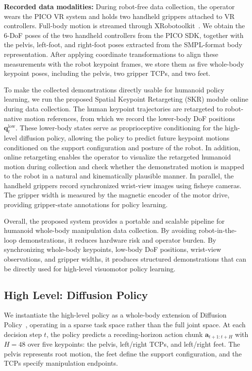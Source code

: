 \documentclass[letterpaper, 10 pt, conference]{ieeeconf}  %
\begin{document}
\textbf{Recorded data modalities:}
During robot-free data collection, the operator wears the PICO VR system and holds two handheld grippers attached to VR controllers. Full-body motion is streamed through XRobotoolkit~\cite{xrobotoolkit}. We obtain the 6-DoF poses of the two handheld controllers from the PICO SDK, together with the pelvis, left-foot, and right-foot poses extracted from the SMPL-format body representation. After applying coordinate transformations to align these measurements with the robot keypoint frames, we store them as five whole-body keypoint poses, including the pelvis, two gripper TCPs, and two feet.

To make the collected demonstrations directly usable for humanoid policy learning, we run the proposed Spatial Keypoint Retargeting (SKR) module online during data collection. The human keypoint trajectories are retargeted to robot-native motion references, from which we record the lower-body DoF positions $\mathbf{q}^{\mathrm{low}}_t$. These lower-body states serve as proprioceptive conditioning for the high-level diffusion policy, allowing the policy to predict future keypoint motions conditioned on the support configuration and posture of the robot. In addition, online retargeting enables the operator to visualize the retargeted humanoid motion during collection and check whether the demonstrated motion is mapped to the robot in a natural and kinematically plausible manner. In parallel, the handheld grippers record synchronized wrist-view images using fisheye cameras. The gripper width is measured by the magnetic encoder of the motor drive, providing gripper-state annotations for policy learning.




Overall, the proposed system provides a portable and scalable pipeline for humanoid whole-body manipulation data collection. By avoiding robot-in-the-loop demonstrations, it reduces hardware risk and operator burden. By synchronizing whole-body keypoints, low-body DoF positions, wrist-view observations, and gripper widths, it produces structured demonstrations that can be directly used for high-level visuomotor policy learning.




\subsection{High Level: Diffusion Policy}

We instantiate the high-level policy as a whole-body extension of Diffusion Policy~\cite{diffusionpolicy}, operating in a sparse task space rather than the full joint space. At each decision step $t$, the policy predicts a receding-horizon action chunk $\mathbf{a}_{t+1:t+H}$ with $H{=}48$ over five keypoints: the pelvis, left/right TCPs, and left/right feet. The pelvis represents root motion, the feet define the support configuration, and the TCPs specify manipulation endpoints.
\end{document}
